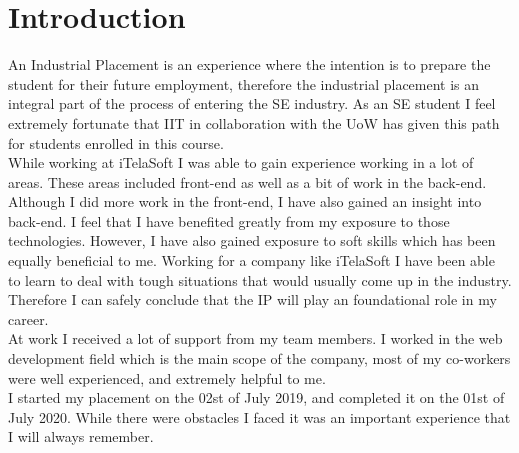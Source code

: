 \documentclass[12pt]{article}
\begin{document}
\section{Introduction}
An Industrial Placement is an experience where the intention is to prepare the student for their
future employment, therefore the industrial placement is an integral part of the process of 
entering the SE industry. As an SE student I feel extremely fortunate that IIT in collaboration with
the UoW has given this path for students enrolled in this course.\\
\newline
While working at iTelaSoft I was able to gain experience working in a lot of areas. These areas included 
front-end as well as a bit of work in the back-end. Although I did more work in the front-end, I have
also gained an insight into back-end. I feel that I have benefited greatly from my exposure to those 
technologies. However, I have also gained exposure to soft skills which has been equally beneficial
to me. Working for a company like iTelaSoft I have been able to learn to deal with tough situations
that would usually come up in the industry. Therefore I can safely conclude that the IP will play
an foundational role in my career.\\
\newline
At work I received a lot of support from my team members. I worked in the web development field which
is the main scope of the company, most of my co-workers were well experienced, and extremely helpful
to me.\\
\newline
I started my placement on the 02st of July 2019, and completed it on the 01st of July 2020. While 
there were obstacles I faced it was an important experience that I will always remember.
\end{document}
